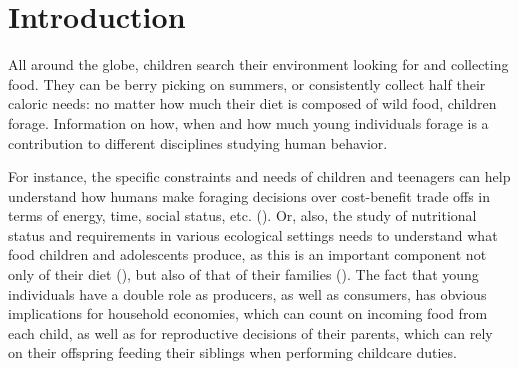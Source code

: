 \section{Introduction}
All around the globe, children search their environment looking for and collecting food. 
They can be berry picking on summers, or consistently collect half their caloric needs: no matter how much their diet is composed of wild food, children forage. 
Information on how, when and how much young individuals forage is a contribution to different disciplines studying human behavior.

For instance, the specific constraints and needs of children and teenagers can help understand how humans make foraging decisions over cost-benefit trade offs in terms of energy, time, social status, etc. (\cite{bliege_bird_children_1995, bird_ethnoarchaeology_2000, bird_children_2002}).
Or, also, the study of nutritional status and requirements in various ecological settings needs to understand what food children and adolescents produce, as this is an important component not only of their diet (\cite{pollom_changes_2020, pollom_effects_nodate, mcgarry_children_2009}),
but also of that of their families (\cite{fouts_who_2009}). 
The fact that young individuals have a double role as producers, as well as consumers, has obvious implications for household economies, which can count on incoming food from each child, as well as for reproductive decisions of their parents, which can rely on their offspring feeding their siblings when performing childcare duties. 

